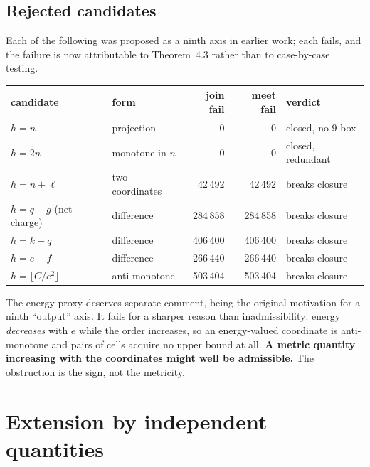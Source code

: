 \documentclass[11pt,a4paper]{article}
\theoremstyle{definition}
\begin{document}
\subsection{Rejected candidates}
\label{sec:rejected}
Each of the following was proposed as a ninth axis in earlier work; each fails,
and the failure is now attributable to Theorem~4.3 rather than to case-by-case
testing.

\begin{center}\small
\begin{tabular}{@{}llrrl@{}}
\toprule
candidate & form & join fail & meet fail & verdict\\
\midrule
$h=n$                  & projection      & 0       & 0       & closed, no 9-box\\
$h=2n$                 & monotone in $n$ & 0       & 0       & closed, redundant\\
$h=n+\ell$             & two coordinates & 42\,492 & 42\,492 & breaks closure\\
$h=q-g$ (net charge)   & difference      & 284\,858& 284\,858& breaks closure\\
$h=k-q$                & difference      & 406\,400& 406\,400& breaks closure\\
$h=e-f$                & difference      & 266\,440& 266\,440& breaks closure\\
$h=\lfloor C/e^{2}\rfloor$ & anti-monotone & 503\,404 & 503\,404 & breaks closure\\
\bottomrule
\end{tabular}
\end{center}
\vspace{2mm}

The energy proxy deserves separate comment, being the original motivation for a
ninth ``output'' axis. It fails for a sharper reason than inadmissibility:
energy \emph{decreases} with $e$ while the order increases, so an energy-valued
coordinate is anti-monotone and pairs of cells acquire no upper bound at all.
\textbf{A metric quantity increasing with the coordinates might well be
admissible.} The obstruction is the sign, not the metricity.

\section{Extension by independent quantities}
\end{document}
